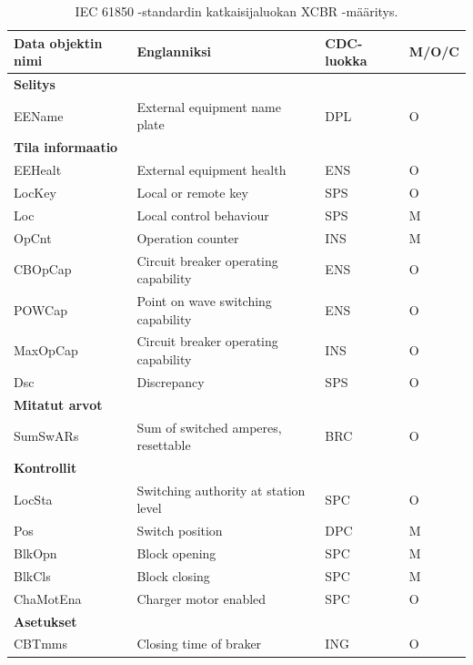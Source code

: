 \begin{table}[ht!]
	\caption{IEC 61850 -standardin katkaisijaluokan XCBR -määritys.}
	\label{tab:iec61850-xcbr-class-definition}
	\begin{tabular}{l | l | l | l}
		\hline
		\textbf{Data objektin nimi} & \textbf{Englanniksi} & \textbf{CDC-luokka} & \textbf{M/O/C} \\
		\hline \hline
		\multicolumn{4}{l}{\textbf{Selitys}} \\
		\hline
		EEName & External equipment name plate & DPL & O \\
		\hline
		\multicolumn{4}{l}{\textbf{Tila informaatio}} \\
		\hline
		EEHealt & External equipment health & ENS & O \\
		LocKey & Local or remote key & SPS & O \\
		Loc & Local control behaviour & SPS & M \\
		OpCnt & Operation counter & INS & M \\
		CBOpCap & Circuit breaker operating capability & ENS & O \\
		POWCap & Point on wave switching capability & ENS & O \\
		MaxOpCap & Circuit breaker operating capability & INS & O \\
		Dsc & Discrepancy & SPS & O \\
		\hline
		\multicolumn{4}{l}{\textbf{Mitatut arvot}} \\
		\hline
		SumSwARs & Sum of switched amperes, resettable & BRC & O \\
		\hline
		\multicolumn{4}{l}{\textbf{Kontrollit}} \\
		\hline
		LocSta & Switching authority at station level & SPC & O \\
		Pos & Switch position & DPC & M \\
		BlkOpn & Block opening & SPC & M \\
		BlkCls & Block closing & SPC & M \\
		ChaMotEna & Charger motor enabled & SPC & O \\
		\hline
		\multicolumn{4}{l}{\textbf{Asetukset}} \\
		\hline
		CBTmms & Closing time of braker & ING & O \\
		\hline
	\end{tabular}
\end{table}

